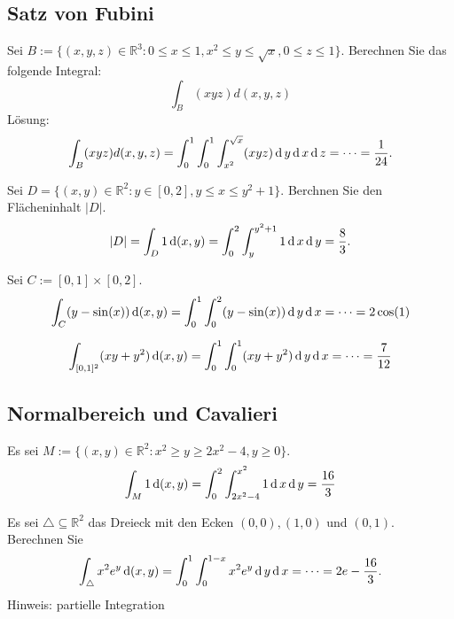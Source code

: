 \subsection{Satz von Fubini}
Sei $B := \{(x,y,z) \in \mathbb{R}^3 : 0 \leq x \leq 1, x^2 \leq y \leq \sqrt{x}, 0 \leq z \leq 1\}$.
Berechnen Sie das folgende Integral:
\begin{displaymath}
  \int_B (xyz) d(x,y,z)
\end{displaymath}
Lösung:
\begin{displaymath}
  \int_B (xyz) d(x,y,z) = \int_0^1 \int_0^1 \int_{x^2}^{\sqrt{x}} (xyz) \operatorname{\mathop{}\!\mathrm{d}} y \operatorname{\mathop{}\!\mathrm{d}} x \operatorname{\mathop{}\!\mathrm{d}} z = \dots = \frac{1}{24}.
\end{displaymath}

Sei $D = \{(x,y) \in \mathbb{R}^2 : y \in [0,2], y \leq x \leq y^2 + 1\}$.
Berchnen Sie den Flächeninhalt $|D|$.
\begin{displaymath}
  |D| = \int_D 1 \operatorname{\mathop{}\!\mathrm{d}} (x,y) = \int_0^2 \int_y^{y^2 + 1} 1 \operatorname{\mathop{}\!\mathrm{d}} x \operatorname{\mathop{}\!\mathrm{d}} y = \frac{8}{3}.
\end{displaymath}

Sei $C := [0,1] \times [0,2]$.
\begin{displaymath}
  \int_C (y - \sin(x)) \operatorname{\mathop{}\!\mathrm{d}}(x,y) = \int_0^1 \int_0^2 (y - \sin(x)) \operatorname{\mathop{}\!\mathrm{d}} y \operatorname{\mathop{}\!\mathrm{d}} x = \dots = 2 \cos(1)
\end{displaymath}

\begin{displaymath}
  \int_{[0,1]^2} (xy + y^2) \operatorname{\mathop{}\!\mathrm{d}}(x,y) = \int_0^1 \int_0^1 (xy + y^2) \operatorname{\mathop{}\!\mathrm{d}} y \operatorname{\mathop{}\!\mathrm{d}} x = \dots = \frac{7}{12}
\end{displaymath}

\subsection{Normalbereich und Cavalieri}
Es sei $M := \{(x,y) \in \mathbb{R}^2 : x^2 \geq y \geq 2x^2 - 4, y \geq 0\}$.
\begin{displaymath}
  \int_M 1 \operatorname{\mathop{}\!\mathrm{d}} (x,y) = \int_0^2 \int_{2x^2 - 4}^{x^2} 1 \operatorname{\mathop{}\!\mathrm{d}} x \operatorname{\mathop{}\!\mathrm{d}} y = \frac{16}{3}
\end{displaymath}

Es sei $\triangle \subseteq \mathbb{R}^2$ das Dreieck mit den Ecken $(0,0), (1,0)$ und $(0,1)$.
Berechnen Sie
\begin{displaymath}
  \int_{\triangle} x^2e^y \operatorname{\mathop{}\!\mathrm{d}} (x,y) = \int_0^1 \int_0^{1 - x} x^2 e^y \operatorname{\mathop{}\!\mathrm{d}} y \operatorname{\mathop{}\!\mathrm{d}} x = \dots = 2e - \frac{16}{3}.
\end{displaymath}
Hinweis: partielle Integration

